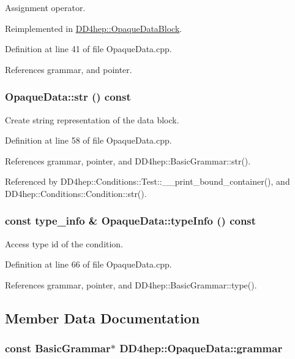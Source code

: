 Assignment operator. 

Reimplemented in \hyperlink{class_d_d4hep_1_1_opaque_data_block_a9fa632b86dc6203b7077c9f09cb23853}{DD4hep::OpaqueDataBlock}.

Definition at line 41 of file OpaqueData.cpp.

References grammar, and pointer.\hypertarget{class_d_d4hep_1_1_opaque_data_ae6b9e39bcf528eb264e350406792470e}{
\subsubsection[{str}]{ OpaqueData::str () const}}
\label{class_d_d4hep_1_1_opaque_data_ae6b9e39bcf528eb264e350406792470e}


Create string representation of the data block. 

Definition at line 58 of file OpaqueData.cpp.

References grammar, pointer, and DD4hep::BasicGrammar::str().

Referenced by DD4hep::Conditions::Test::\_\-\_\-print\_\-bound\_\-container(), and DD4hep::Conditions::Condition::str().\hypertarget{class_d_d4hep_1_1_opaque_data_a5abca451748e71fa1147402f6498679c}{
\subsubsection[{typeInfo}]{\setlength{\rightskip}{0pt plus 5cm}const type\_\-info \& OpaqueData::typeInfo () const}}
\label{class_d_d4hep_1_1_opaque_data_a5abca451748e71fa1147402f6498679c}


Access type id of the condition. 

Definition at line 66 of file OpaqueData.cpp.

References grammar, pointer, and DD4hep::BasicGrammar::type().

\subsection{Member Data Documentation}
\hypertarget{class_d_d4hep_1_1_opaque_data_ac911f7e23be3e5d583bf5ccebae03e31}{
\subsubsection[{grammar}]{\setlength{\rightskip}{0pt plus 5cm}const {\bf BasicGrammar}$\ast$ {\bf DD4hep::OpaqueData::grammar}}}
\label{class_d_d4hep_1_1_opaque_data_ac911f7e23be3e5d583bf5ccebae03e31}


